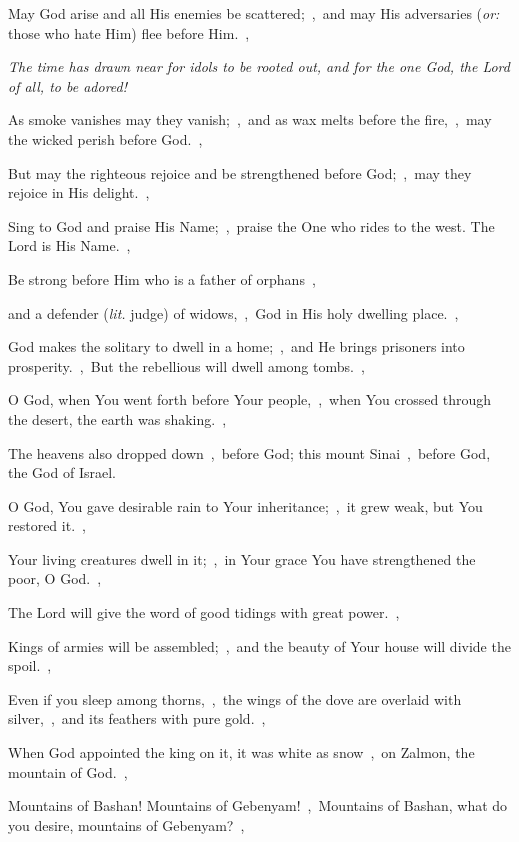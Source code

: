 \documentclass[12pt,twoside,a5paper]{article}
\newcommand{\qanona}[1]{{\liturgicalhint{Qanona.} \emph{#1}}}
\newcommand{\translationoption}[1]{\emph{or:} #1}
\newcommand{\translationliteral}[1]{\emph{lit.} #1}
\begin{document}
\begin{normalparskip}
  May God arise and all His enemies be scattered;~\sep\ and may His adversaries (\translationoption{those who hate Him}) flee before Him.~\sep

  \qanona{The time has drawn near for idols to be rooted out, and for the one God, the Lord of all, to be adored!}

  As smoke vanishes may they vanish;~\sep\ and as wax melts before the fire,~\sep\ may the wicked perish before God.~\sep

  But may the righteous rejoice and be strengthened before God;~\sep\ may they rejoice in His delight.~\sep

  Sing to God and praise His Name;~\sep\ praise the One who rides to the west. The Lord is His Name.~\sep

  Be strong before Him who is a father of orphans~\sep

  and a defender (\translationliteral{judge}) of widows,~\sep\ God in His holy dwelling place.~\sep

  God makes the solitary to dwell in a home;~\sep\ and He brings prisoners into prosperity.~\sep\ But the rebellious will dwell among tombs.~\sep

  O God, when You went forth before Your people,~\sep\ when You crossed through the desert, the earth was shaking.~\sep

  The heavens also dropped down~\sep\ before God; this mount Sinai~\sep\ before God, the God of Israel.

  O God, You gave desirable rain to Your inheritance;~\sep\ it grew weak, but You restored it.~\sep

  Your living creatures dwell in it;~\sep\ in Your grace You have strengthened the poor, O God.~\sep

  The Lord will give the word of good tidings with great power.~\sep

  Kings of armies will be assembled;~\sep\ and the beauty of Your house will divide the spoil.~\sep

  Even if you sleep among thorns,~\sep\ the wings of the dove are overlaid with silver,~\sep\ and its feathers with pure gold.~\sep

  When God appointed the king on it, it was white as snow~\sep\ on Zalmon, the mountain of God.~\sep

  Mountains of Bashan! Mountains of Gebenyam!~\sep\ Mountains of Bashan, what do you desire, mountains of Gebenyam?~\sep


\end{normalparskip}
\end{document}
